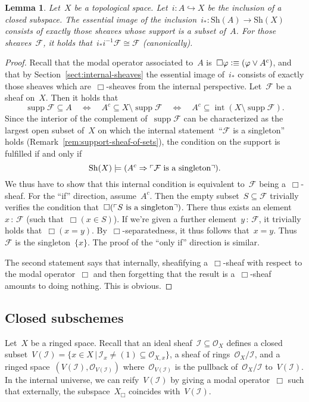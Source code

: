 \documentclass[10pt]{amsart}
\theoremstyle{definition}
\theoremstyle{plain}
\newtheorem{lemma}[defn]{Lemma}
\theoremstyle{remark}
\newcommand{\F}{\mathcal{F}}
\renewcommand{\O}{\mathcal{O}}
\newcommand{\I}{\mathcal{I}}
\newcommand{\Sh}{\mathrm{Sh}}
\DeclareMathOperator{\Int}{int}
\DeclareMathOperator{\supp}{supp}
\newcommand{\?}{\,{:}\,}
\renewcommand{\_}{\mathpunct{.}\,}
\newcommand{\speak}[1]{\ulcorner\text{\textnormal{#1}}\urcorner}
\newcommand{\defequiv}{\vcentcolon\equiv}
\begin{document}
\begin{lemma}\label{lemma:essim-closed-immersion}
Let~$X$ be a topological space. Let~$i : A \hookrightarrow X$ be the inclusion
of a closed subspace. The essential image of the
inclusion~$i_* : \Sh(A) \to \Sh(X)$ consists of exactly those sheaves whose support
is a subset of~$A$. For those sheaves~$\F$, it holds that~$i_* i^{-1} \F \cong \F$
(canonically).\end{lemma}
\begin{proof}Recall that the modal operator associated to~$A$ is~$\Box\varphi
\defequiv (\varphi \vee A^c)$, and that by Section~\ref{sect:internal-sheaves} the
essential image of~$i_*$ consists of exactly those sheaves which
are~$\Box$-sheaves from the internal perspective. Let~$\F$ be a sheaf on~$X$.
Then it holds that
\[ \supp\F \subseteq A \quad\Longleftrightarrow\quad
  A^c \subseteq X \setminus \supp\F \quad\Longleftrightarrow\quad
  A^c \subseteq \Int(X \setminus \supp\F). \]
Since the interior of the complement of~$\supp\F$ can be characterized as the
largest open subset of~$X$ on which the internal statement~``$\F$ is a
singleton'' holds (Remark~\ref{rem:support-sheaf-of-sets}), the condition on
the support is fulfilled if and only if
\[ \Sh(X) \models (A^c \Rightarrow \speak{$\F$ is a singleton}). \]
We thus have to show that this internal condition is equivalent to~$\F$ being
a~$\Box$-sheaf. For the ``if'' direction, assume~$A^c$. Then the empty subset~$S
\subseteq \F$ trivially verifies the condition that~$\Box(\speak{$S$ is a
singleton})$. There thus exists an element~$x\?\F$ (such that~$\Box(x \in S)$).
If we're given a further element~$y\?\F$, it trivially holds that~$\Box(x =
y)$. By~$\Box$-separatedness, it thus follows that~$x = y$. Thus~$\F$ is the
singleton~$\{x\}$. The proof of the ``only if'' direction is similar.

The second statement says that internally, sheafifying a~$\Box$-sheaf with
respect to the modal operator~$\Box$ and then forgetting that the result is
a~$\Box$-sheaf amounts to doing nothing. This is obvious.
\end{proof}

\subsection{Closed subschemes} Let~$X$ be a ringed space. Recall
that an ideal sheaf~$\I \subseteq \O_X$ defines a closed subset~$V(\I) = \{ x
\in X \,|\, \I_x \neq (1) \subseteq \O_{X,x} \}$, a sheaf of
rings~$\O_X/\I$, and a ringed space~$(V(\I), \O_{V(\I)})$ where~$\O_{V(\I)}$ is
the pullback of~$\O_X/\I$ to~$V(\I)$. In the internal universe, we can
reify~$V(\I)$ by giving a modal operator~$\Box$ such that externally, the
subspace~$X_\Box$ coincides with~$V(\I)$.
\end{document}

